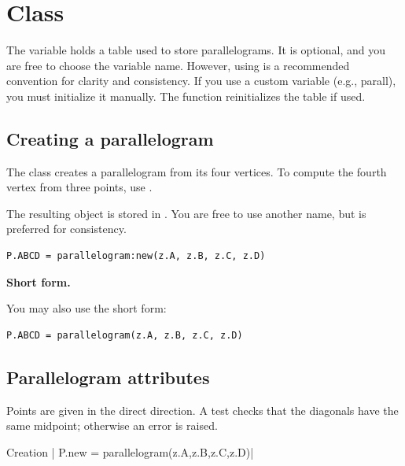 \newpage
\section{Class }
The variable  holds a table used to store parallelograms. It is optional, and you are free to choose the variable name. However, using  is a recommended convention for clarity and consistency. If you use a custom variable (e.g., parall), you must initialize it manually. The  function reinitializes the  table if used.


\subsection{Creating a parallelogram}
\label{sub:creating_a_parallelogram}

The  class creates a parallelogram from its four vertices. To compute the fourth vertex from three points, use .

\medskip
The resulting object is stored in . You are free to use another name, but  is preferred for consistency.

\begin{mybox}
\begin{verbatim}
P.ABCD = parallelogram:new(z.A, z.B, z.C, z.D)
\end{verbatim}
\end{mybox}

\textbf{Short form.}

You may also use the short form:

\begin{mybox}
\begin{verbatim}
P.ABCD = parallelogram(z.A, z.B, z.C, z.D)
\end{verbatim}
\end{mybox}

\subsection{Parallelogram attributes}

Points are given in the direct direction. A test checks that the diagonals have the same midpoint; otherwise an error is raised.

\begin{mybox}
Creation | P.new = parallelogram(z.A,z.B,z.C,z.D)|
\end{mybox}


